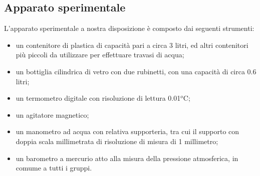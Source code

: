 \subsection{Apparato sperimentale}
L'apparato sperimentale a nostra disposizione è composto dai seguenti strumenti:

\begin{itemize}
	\item{un contenitore di plastica di capacità pari a circa 3 litri, ed altri contenitori più piccoli da utilizzare per effettuare travasi di acqua;}
	\item{un bottiglia cilindrica di vetro con due rubinetti, con una capacità di circa 0.6 litri;}
	\item{un termometro digitale con risoluzione di lettura 0.01$^o$C;}
	\item{un agitatore magnetico;}
	\item{un manometro ad acqua con relativa supporteria, tra cui il supporto con doppia scala millimetrata di risoluzione di misura di 1 millimetro;}
	\item{un barometro a mercurio atto alla misura della pressione atmosferica, in comume a tutti i gruppi.}
\end{itemize}
